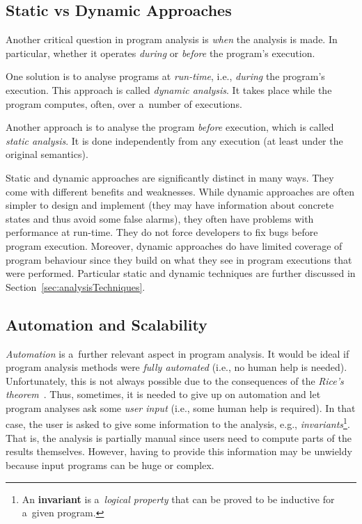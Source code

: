 \subsection{Static vs Dynamic Approaches}

Another critical question in program analysis is \emph{when} the analysis is made. In particular, whether it operates \emph{during} or \emph{before} the program's execution.

One solution is to analyse programs at \emph{run-time}, i.e., \emph{during} the program's execution. This approach is called \emph{dynamic analysis}. It takes place while the program computes, often, over a~number of executions.

Another approach is to analyse the program \emph{before} execution, which is called \emph{static analysis}. It is done independently from any execution (at least under the original semantics).

Static and dynamic approaches are significantly distinct in many ways. They come with different benefits and weaknesses. While dynamic approaches are often simpler to design and implement (they may have information about concrete states and thus avoid some false alarms), they often have problems with performance at run-time. They do not force developers to fix bugs before program execution. Moreover, dynamic approaches do have limited coverage of program behaviour since they build on what they see in program executions that were performed. Particular static and dynamic techniques are further discussed in Section~\ref{sec:analysisTechniques}.

\subsection{Automation and Scalability}

\emph{Automation} is a~further relevant aspect in program analysis. It would be ideal if program analysis methods were \emph{fully automated} (i.e., no human help is needed). Unfortunately, this is not always possible due to the consequences of the \emph{Rice's theorem}~\cite{rice}. Thus, sometimes, it is needed to give up on automation and let program analyses ask some \emph{user input} (i.e., some human help is required). In that case, the user is asked to give some information to the analysis, e.g., \emph{invariants}\footnote{An \textbf{invariant} is a~\emph{logical property} that can be proved to be inductive for a~given program.}. That is, the analysis is partially manual since users need to compute parts of the results themselves. However, having to provide this information may be unwieldy because input programs can be huge or complex.

